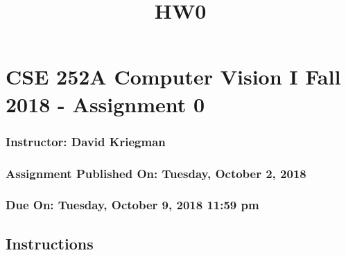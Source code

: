 \documentclass[11pt]{article}
\title{HW0}
\begin{document}
    
    
    \maketitle
    
    

    
    \hypertarget{cse-252a-computer-vision-i-fall-2018---assignment-0}{%
\section{CSE 252A Computer Vision I Fall 2018 - Assignment
0}\label{cse-252a-computer-vision-i-fall-2018---assignment-0}}

\hypertarget{instructor-david-kriegman}{%
\subsubsection{Instructor: David
Kriegman}\label{instructor-david-kriegman}}

\hypertarget{assignment-published-on-tuesday-october-2-2018}{%
\subsubsection{Assignment Published On: Tuesday, October 2,
2018}\label{assignment-published-on-tuesday-october-2-2018}}

\hypertarget{due-on-tuesday-october-9-2018-1159-pm}{%
\subsubsection{Due On: Tuesday, October 9, 2018 11:59
pm}\label{due-on-tuesday-october-9-2018-1159-pm}}

\hypertarget{instructions}{%
\subsection{Instructions}\label{instructions}}
\end{document}
